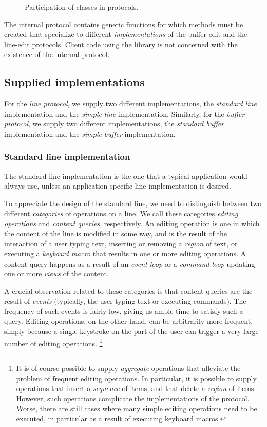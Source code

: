 \begin{figure}
\begin{center}
\end{center}
\caption{\label{fig-participation}
Participation of classes in protocols.}
\end{figure}

The internal protocol contains generic functions for which methods
must be created that specialize to different \emph{implementations} of
the buffer-edit and the line-edit protocols.  Client code using the
library is not concerned with the existence of the internal protocol.

\subsection{Supplied implementations}

For the \emph{line protocol}, we supply two different implementations,
the \emph{standard line} implementation and the \emph{simple line}
implementation.  Similarly, for the \emph{buffer protocol}, we supply
two different implementations, the \emph{standard buffer} implementation
and the \emph{simple buffer} implementation.

\subsubsection{Standard line implementation}

The standard line implementation is the one that a typical application
would always use, unless an application-specific line implementation
is desired.

To appreciate the design of the standard line, we need to distinguish
between two different \emph{categories} of operations on a line.  We
call these categories \emph{editing operations} and \emph{content
  queries}, respectively.  An editing operation is one in which the
content of the line is modified in some way, and is the result of the
interaction of a user typing text, inserting or removing a
\emph{region} of text, or executing a \emph{keyboard macro} that
results in one or more editing operations.  A content query happens
as a result of an \emph{event loop} or a \emph{command loop} updating
one or more \emph{views} of the content.

A crucial observation related to these categories is that content
queries are the result of \emph{events} (typically, the user typing
text or executing commands).  The frequency of such events is fairly
low, giving us ample time to satisfy such a query.  Editing
operations, on the other hand, can be arbitrarily more frequent,
simply because a single keystroke on the part of the user can trigger
a very large number of editing operations.%
\footnote{It is of course possible to supply \emph{aggregate}
  operations that alleviate the problem of frequent editing
  operations.  In particular, it is possible to supply operations that
  insert a \emph{sequence} of items, and that delete a \emph{region}
  of items.  However, such operations complicate the implementations
  of the protocol.  Worse, there are still cases where many simple
  editing operations need to be executed, in particular as a result of
  executing keyboard macros.}

